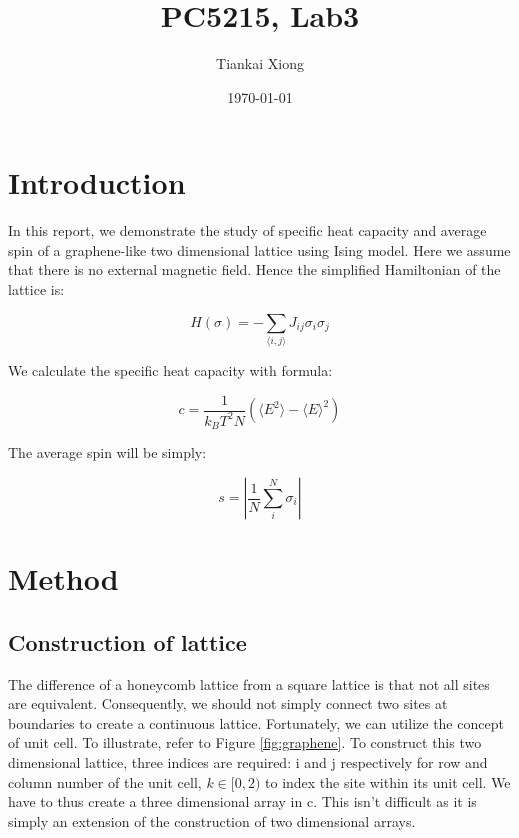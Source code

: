 \documentclass{article}
\author{Tiankai Xiong}
\date{\today}
\title{PC5215, Lab3}
\begin{document}
\maketitle

\section{Introduction}
\label{sec-1}

In this report, we demonstrate the study of specific heat capacity
and average spin of a graphene-like two dimensional lattice using
Ising model. Here we assume that there is no external magnetic
field. Hence the simplified Hamiltonian of the lattice is:

$$H(\sigma) = - \sum_{\langle i, j\rangle}J_{ij} \sigma_i \sigma_j$$

We calculate the specific heat capacity with formula:

$$c = \frac{1}{k_B T^2 N}(\langle E^2 \rangle - \langle E \rangle ^2)$$

The average spin will be simply:

$$s = |\frac{1}{N} \sum_i^N \sigma_i|$$

\section{Method}
\label{sec-2}

\subsection{Construction of lattice}
\label{sec-2-1}

The difference of a honeycomb lattice from a square lattice is that
not all sites are equivalent. Consequently, we should not simply
connect two sites at boundaries to create a continuous
lattice. Fortunately, we can utilize the concept of unit cell. To
illustrate, refer to Figure \ref{fig:graphene}. To construct this
two dimensional lattice, three indices are required: i and j
respectively for row and column number of the unit cell, $k\in [0,
   2)$ to index the site within its unit cell. We have to thus create
a three dimensional array in c. This isn't difficult as it is
simply an extension of the construction of two dimensional arrays.
\end{document}
